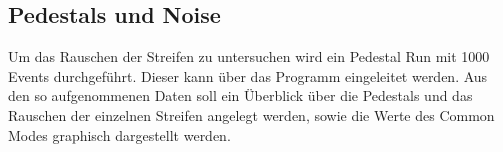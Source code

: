 \subsection{Pedestals und Noise}

Um das Rauschen der Streifen zu untersuchen wird ein Pedestal Run mit 1000 Events durchgeführt.
Dieser kann über das Programm eingeleitet werden.
Aus den so aufgenommenen Daten soll ein Überblick über die Pedestals und das Rauschen der einzelnen Streifen angelegt werden, sowie die Werte des Common Modes graphisch dargestellt werden.
